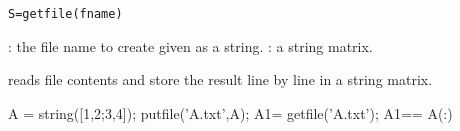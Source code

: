 
\begin{mandesc}
\end{mandesc}
\begin{calling_sequence}
\begin{verbatim}
S=getfile(fname)
\end{verbatim}
\end{calling_sequence}
\begin{parameters}
  \begin{varlist}
     : the file name to create given as a string.
     : a string matrix.
  \end{varlist}
\end{parameters}

\begin{mandescription}
reads file contents and store the result line by line in a string matrix.
\end{mandescription}

\begin{examples}
  \begin{program}
    A = string([1,2;3,4]);
    putfile('A.txt',A);
    A1= getfile('A.txt');
    A1== A(:)
  \end{program}
\end{examples}


